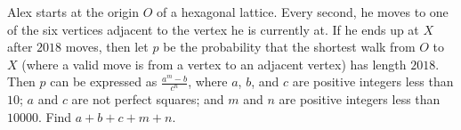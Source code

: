 Alex starts at the origin $O$ of a hexagonal lattice. Every second, he moves to one of the six vertices adjacent to the vertex he is currently at. If he ends up at $X$ after $2018$ moves, then let $p$ be the probability that the shortest walk from $O$ to $X$ (where a valid move is from a vertex to an adjacent vertex) has length $2018$. Then $p$ can be expressed as $\tfrac{a^m-b}{c^n}$,  where $a$,  $b$,  and $c$ are positive integers less than $10$; $a$ and $c$ are not perfect squares; and $m$ and $n$ are positive integers less than $10000$. Find $a+b+c+m+n$.